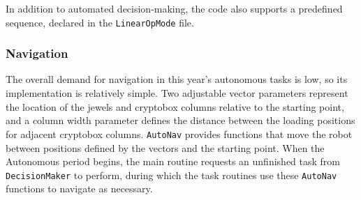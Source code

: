 \documentclass[letterpaper]{article}
\begin{document}
In addition to automated decision-making, the code also supports a predefined sequence, declared in the \texttt{LinearOpMode} file.

\subsubsection{Navigation}
The overall demand for navigation in this year's autonomous tasks is low, so its implementation is relatively simple. Two adjustable vector parameters represent the location of the jewels and cryptobox columns relative to the starting point, and a column width parameter defines the distance between the loading positions for adjacent cryptobox columns. \texttt{AutoNav} provides functions that move the robot between positions defined by the vectors and the starting point. When the Autonomous period begins, the main routine requests an unfinished task from \texttt{DecisionMaker} to perform, during which the task routines use these \texttt{AutoNav} functions to navigate as necessary.




\end{document}
